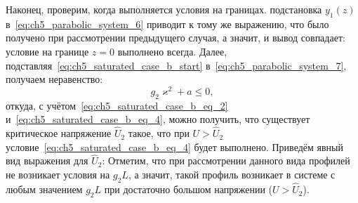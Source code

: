 Наконец, проверим, когда выполняется условия на границах.
подстановка $y_1(z)$ в~\eqref{eq:ch5_parabolic_system_6} приводит к тому же выражению, что было получено при рассмотрении предыдущего случая, а значит, и вывод совпадает: условие на границе $z = 0$ выполнено всегда.
Далее, подставляя~\eqref{eq:ch5_saturated_case_b_start} в~\eqref{eq:ch5_parabolic_system_7}, получаем неравенство:
\begin{equation}\label{eq:ch5_saturated_case_b_eq_5}
	g_2 \varkappa^2 + a \leq 0,
\end{equation}
откуда, с учётом~\eqref{eq:ch5_saturated_case_b_eq_2} и~\eqref{eq:ch5_saturated_case_b_eq_4}, можно получить, что существует критическое напряжение $\hat{U}_2$ такое, что при $U > \hat{U}_2$ условие~\eqref{eq:ch5_saturated_case_b_eq_4} будет выполнено.
Приведём явный вид выражения для $\hat{U}_2$:
Отметим, что при рассмотрении данного вида профилей не возникает условия на $g_2 L$, а значит, такой профиль возникает в системе с любым значением $g_2 L$ при достаточно большом напряжении ($U > \hat{U}_2$).


